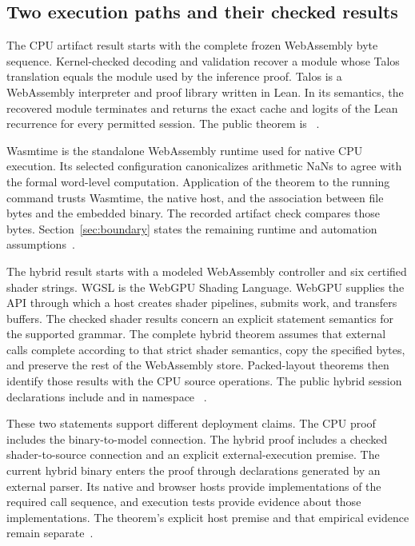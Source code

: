 \subsection{Two execution paths and their checked results}

The CPU artifact result starts with the complete frozen WebAssembly byte sequence.  Kernel-checked decoding and validation recover a module whose Talos translation equals the module used by the inference proof.  Talos is a WebAssembly interpreter and proof library written in Lean.  In its semantics, the recovered module terminates and returns the exact cache and logits of the Lean recurrence for every permitted session.  The public theorem is ~\cite{artifact}.

Wasmtime is the standalone WebAssembly runtime used for native CPU execution.  Its selected configuration canonicalizes arithmetic NaNs to agree with the formal word-level computation.  Application of the theorem to the running command trusts Wasmtime, the native host, and the association between file bytes and the embedded binary.  The recorded artifact check compares those bytes.  Section~\ref{sec:boundary} states the remaining runtime and automation assumptions~\cite{wasmtimeintro,wasmtime,artifactgate}.

The hybrid result starts with a modeled WebAssembly controller and six certified shader strings.  WGSL is the WebGPU Shading Language.  WebGPU supplies the API through which a host creates shader pipelines, submits work, and transfers buffers.  The checked shader results concern an explicit statement semantics for the supported grammar.  The complete hybrid theorem assumes that external calls complete according to that strict shader semantics, copy the specified bytes, and preserve the rest of the WebAssembly store.  Packed-layout theorems then identify those results with the CPU source operations.  The public hybrid session declarations include  and  in namespace ~\cite{wg-execution,wg-backend,wg-composition}.

These two statements support different deployment claims.  The CPU proof includes the binary-to-model connection.  The hybrid proof includes a checked shader-to-source connection and an explicit external-execution premise.  The current hybrid binary enters the proof through declarations generated by an external parser.  Its native and browser hosts provide implementations of the required call sequence, and execution tests provide evidence about those implementations.  The theorem's explicit host premise and that empirical evidence remain separate~\cite{wg-build,wg-host,wg-review}.

